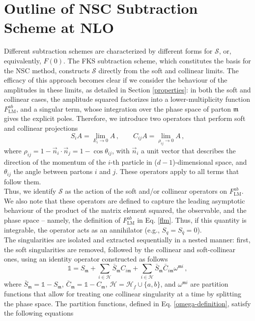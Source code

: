 \documentclass[a4paper, 12pt]{book}
\newcommand{\um}{\mathfrak{m}}
\begin{document}
\section{Outline of NSC Subtraction Scheme at NLO}
Different subtraction schemes are characterized by different forms for $\mathcal{S}$, or, equivalently, $F(0)$. The FKS subtraction scheme, which constitutes the basis for the NSC method, constructs $\mathcal{S}$ directly from the soft and collinear limits. The efficacy of this approach becomes clear if we consider the behaviour of the amplitudes in these limits, as detailed in Section \ref{properties}: in both the soft and collinear cases, the amplitude squared factorizes into a  lower-multiplicity function $F^{ab}_{\mathrm{LM}}$, and a singular term, whose integration over the phase space of parton $\um$ gives the explicit poles. Therefore, we introduce two operators that perform soft and collinear projections
\begin{equation}
    S_i A = \lim_{E_i \to 0} A \, , \qquad C_{ij}A = \lim_{\rho_{ij}\to 0}A \, ,
    \label{projections}
\end{equation}
where $\rho_{ij}= 1 - \vec{n}_i \cdot \vec{n}_j = 1 - \cos{\theta_{ij}}$, with $\vec{n}_i$ a unit vector that describes the direction of the momentum of the $i$-th particle in ($d-1$)-dimensional space, and $\theta_{ij}$ the angle between partons $i$ and $j$. These operators apply to all terms that follow them. \\
Thus, we identify $\mathcal{S}$ as the action of the soft and/or collinear operators on $F^{ab}_{\mathrm{LM}}$. We also note that these operators are defined to capture the leading asymptotic behaviour of the product of the matrix element squared, the observable, and the phase space – namely, the definition of $F^{ab}_{\mathrm{LM}}$ in Eq. \ref{flm}. Thus, if this quantity is integrable, the operator acts as an annihilator (e.g., $S_q = S_{\bar{q}}=0$). \\
The singularities are isolated and extracted sequentially in a nested manner: first, the soft singularities are removed, followed by the collinear and soft-collinear ones, using an identity operator constructed as follows
\begin{equation}
    \mathbb{1} = S_\um + \sum_{i \in \mathcal{H}} \bar{ S}_\um C_{i\um} + \sum_{i \in \mathcal{H}} \bar{S}_\um \bar{C}_{i \um} \omega^{\um i} \, ,
    \label{identity-soft-coll}
\end{equation}
where $\bar{ S}_\um= \mathbb{1} - S_\um$, $\bar{ C}_\um= \mathbb{1} - C_\um$, $\mathcal{H} = \mathcal{H}_f \cup \{a,b\}$, and $\omega^{\um i}$ are partition functions that  allow for treating one collinear singularity at a time by splitting the phase space. The partition functions, defined in Eq. \ref{omega-definition}, satisfy the following equations
\end{document}
